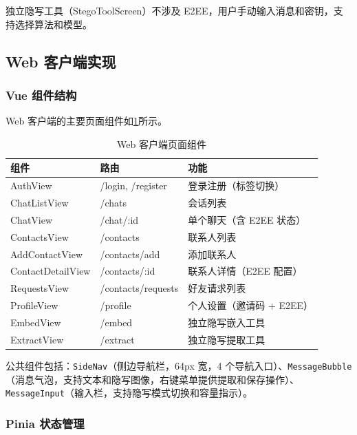 独立隐写工具（StegoToolScreen）不涉及 E2EE，用户手动输入消息和密钥，支持选择算法和模型。

\subsection{Web 客户端实现}

\subsubsection{Vue 组件结构}

Web 客户端的主要页面组件如\cref{tab:web_views}所示。

\begin{table}[htb!]
    \caption{Web 客户端页面组件}
    \centering
    \begin{tabular}{llp{5cm}}
        \hline
        \textbf{组件} & \textbf{路由} & \textbf{功能} \\
        \hline
        AuthView & /login, /register & 登录注册（标签切换） \\
        ChatListView & /chats & 会话列表 \\
        ChatView & /chat/:id & 单个聊天（含 E2EE 状态） \\
        ContactsView & /contacts & 联系人列表 \\
        AddContactView & /contacts/add & 添加联系人 \\
        ContactDetailView & /contacts/:id & 联系人详情（E2EE 配置） \\
        RequestsView & /contacts/requests & 好友请求列表 \\
        ProfileView & /profile & 个人设置（邀请码 + E2EE） \\
        EmbedView & /embed & 独立隐写嵌入工具 \\
        ExtractView & /extract & 独立隐写提取工具 \\
        \hline
    \end{tabular}
    \label{tab:web_views}
\end{table}

公共组件包括：\texttt{SideNav}（侧边导航栏，64px 宽，4 个导航入口）、\texttt{MessageBubble}（消息气泡，支持文本和隐写图像，右键菜单提供提取和保存操作）、\texttt{MessageInput}（输入栏，支持隐写模式切换和容量指示）。

\subsubsection{Pinia 状态管理}

